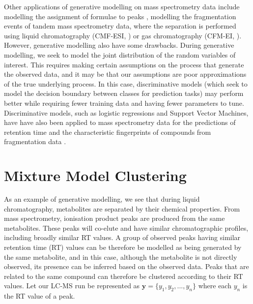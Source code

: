 Other applications of generative modelling on mass spectrometry data include modelling the assignment of formulae to peaks \cite{Rogers2009a, Silva2014}, modelling the fragmentation events of tandem mass spectrometry data, where the separation is performed using liquid chromatography (CMF-ESI, \cite{Allen2014}) or gas chromatography (CFM-EI, \cite{Allen2016}). However, generative modelling also have some drawbacks. During generative modelling, we seek to model the joint distribution of the random variables of interest. This requires making certain assumptions on the process that generate the observed data, and it may be that our assumptions are poor approximations of the true underlying process. In this case, discriminative models (which seek to model the decision boundary between classes for prediction tasks) may perform better while requiring fewer training data \cite{jordan2002discriminative} and having fewer parameters to tune. Discriminative models, such as logistic regressions and Support Vector Machines, have have also been applied to mass spectrometry data for the predictions of retention time \cite{Creek2011, Cao2015, Stanstrup2015} and the characteristic fingerprints of compounds from fragmentation data \cite{Heinonen2012a, Duhrkop2015}. 

\section{Mixture Model Clustering}
\label{sub:background-mixture-model-clustering}

As an example of generative modelling, we see that during liquid chromatography, metabolites are separated by their chemical properties. From mass spectrometry, ionisation product peaks are produced from the same metabolites. These peaks will co-elute and have similar chromatographic profiles, including broadly similar RT values. A group of observed peaks having similar retention time (RT) values can be therefore be modelled as being generated by the same metabolite, and in this case, although the metabolite is not directly observed, its presence can be inferred based on the observed data. Peaks that are related to the same compound can therefore be clustered according to their RT values. Let our LC-MS run be represented as $\mathbf{y}=\{y_{1},y_{2},...,y_{n}\}$ where each $y_n$ is the RT value of a peak. 

